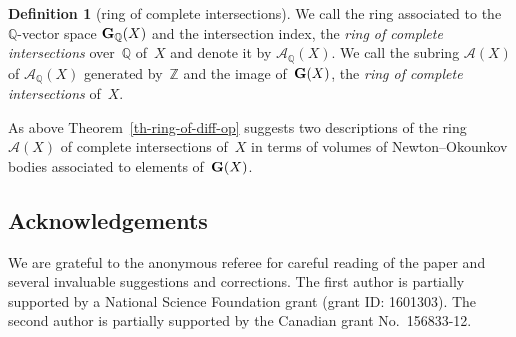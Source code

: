 \documentclass[10pt,a4paper]{amsart}
\def \Z{\mathbb{Z}}
\def \Q{\mathbb{Q}}
\def \A{\mathcal{A}}
\def \G{{\bf G}}
\numberwithin{equation}{section}
\theoremstyle{definition}
\newtheorem{Def}[Th]{Definition}
\begin{document}
\begin{Def}[ring of complete intersections] \label{def-ring-of-complete-intersec-general}
We call the ring associated to the $\Q$-vector space $\G_\Q(X)$ and the intersection index, the {\it ring of complete intersections} over~$\Q$ of~$X$ and denote it by $\A_\Q(X)$. We call the subring $\A(X)$ of $\A_\Q(X)$ generated by~$\Z$ and the image of~$\G(X)$, the {\it ring of complete intersections} of~$X$.
\end{Def}

As above Theorem~\ref{th-ring-of-diff-op} suggests two descriptions of the ring $\A(X)$ of complete intersections of~$X$ in terms of volumes of Newton--Okounkov bodies associated to elements of~$\G(X)$.

\subsection*{Acknowledgements}
We are grateful to the anonymous referee for careful reading of the paper and several invaluable suggestions and corrections. The first author is partially supported by a National Science Foundation grant (grant ID: 1601303). The second author is partially supported by the Canadian grant No.~156833-12.

\end{document}
